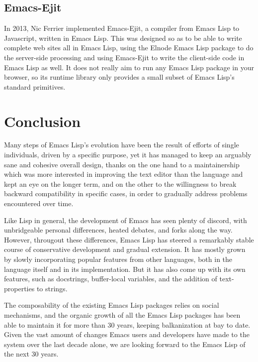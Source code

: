 \documentclass[format=acmsmall, review]{acmart}
\newcommand \Elisp {Emacs Lisp}
\begin{document}
\subsection{Emacs-Ejit}

In 2013, Nic Ferrier implemented Emacs-Ejit, a compiler from \Elisp{} to
Javascript, written in \Elisp{}.  This was designed so as to be able to write complete web sites
all in \Elisp{}, using the Elnode \Elisp{} package to do the server-side
processing and using Emacs-Ejit to write the client-side code in \Elisp{}
as well.  It does not really aim to run any \Elisp{} package in your
browser, so its runtime library only provides a small subset of \Elisp's
standard primitives.

\section{Conclusion}
\label{sec:conclusion}

Many steps of \Elisp's evolution have been the result of efforts of single
individuals, driven by a specific purpose, yet it has managed to keep an
arguably sane and cohesive overall design, thanks on the one hand to
a maintainership which was more interested in improving the text editor than
the language and kept an eye on the longer term, and on the other to the
willingness to break backward compatibility in specific cases, in order to
gradually address problems encountered over time.

Like Lisp in general, the development of Emacs has seen plenty of
discord, with unbridgeable personal differences, heated debates, and
forks along the way.  However, througout these differences, \Elisp{}
has steered a remarkably stable course of conservative development and
gradual extension.  It has mostly grown by slowly incorporating popular
features from other languages, both in the language itself and in its
implementation.  But it has also come up with its own features, such as
docstrings, buffer-local variables, and the addition of text-properties
to strings.

The composability of the existing \Elisp{} packages relies on social
mechanisms, and the organic growth of all the \Elisp{} packages has
been able to maintain it for more than 30 years, keeping balkanization
at bay to date.  Given the vast amount of changes Emacs users and
developers have made to the system over the last decade alone, we are
looking forward to the \Elisp{} of the next 30 years.

\end{document}
